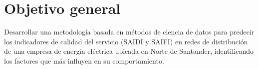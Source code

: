 
\label{sec:objetivos}

\section{Objetivo general}

Desarrollar una metodología basada en métodos de ciencia de datos para predecir los indicadores de calidad del servicio (SAIDI y SAIFI) en redes de distribución de una empresa de energía eléctrica ubicada en Norte de Santander, identificando los factores que más influyen en su comportamiento.